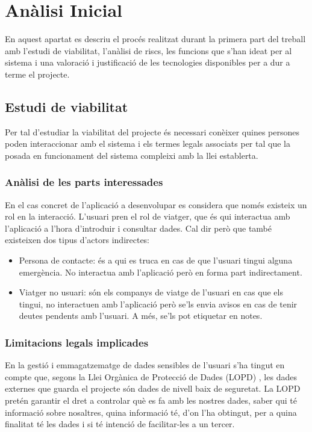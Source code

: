 
\chapter{Anàlisi Inicial} %

\label{AnalisiInicial} %

En aquest apartat es descriu el procés realitzat durant la primera part del treball amb l'estudi de viabilitat, l'anàlisi de riscs, les funcions que s'han ideat per al sistema i una valoració i justificació de les tecnologies disponibles per a dur a terme el projecte.

\section{Estudi de viabilitat}
Per tal d'estudiar la viabilitat del projecte és necessari conèixer quines persones poden interaccionar amb el sistema i els termes legals associats per tal que la posada en funcionament del sistema compleixi amb la llei establerta.

\subsection{Anàlisi de les parts interessades}
En el cas concret de l'aplicació a desenvolupar es considera que només existeix
un rol en la interacció. L'usuari pren el rol de viatger, que és qui interactua
amb l'aplicació a l'hora d'introduir i consultar dades. Cal dir però que també
existeixen dos tipus d'actors indirectes:

\begin{itemize}
\item{}Persona de contacte: és a qui es truca en cas de que l'usuari tingui alguna emergència. No interactua amb l'aplicació però en forma part indirectament.
\item{}Viatger no usuari: són els companys de viatge de l'usuari en cas que els tingui, no interactuen amb l'aplicació però se'ls envia avisos en cas de tenir deutes pendents amb l'usuari. A més, se'ls pot etiquetar en notes.
\end{itemize}

\subsection{Limitacions legals implicades}
En la gestió i emmagatzematge de dades sensibles de l'usuari s'ha tingut en
compte que, segons la Llei Orgànica de Protecció de Dades (LOPD) , les dades externes que guarda el projecte són dades de nivell baix de seguretat. La LOPD pretén garantir el dret a controlar què es fa amb les nostres dades, saber qui té informació sobre nosaltres, quina informació té, d'on l'ha obtingut, per a quina finalitat té les dades i si té intenció de facilitar-les a un tercer.\\


